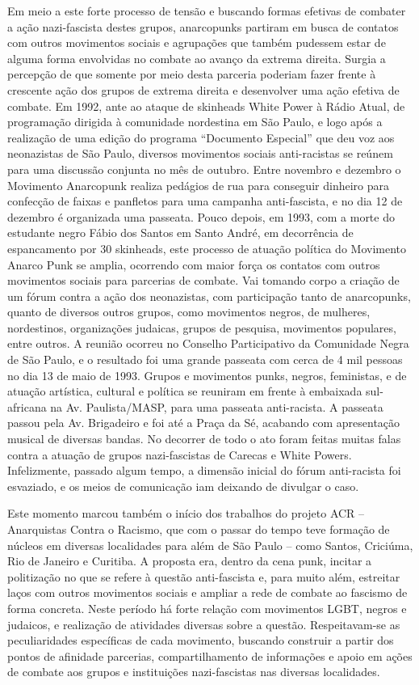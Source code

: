 Em meio a este forte processo de tensão e buscando formas efetivas de combater a ação nazi-fascista destes grupos, anarcopunks partiram em busca de contatos com outros movimentos sociais e agrupações que também pudessem estar de alguma forma envolvidas no combate ao avanço da extrema direita. Surgia a percepção de que somente por meio desta parceria poderiam fazer frente à crescente ação dos grupos de extrema direita e desenvolver uma ação efetiva de combate. Em 1992, ante ao ataque de skinheads White Power à Rádio Atual, de programação dirigida à comunidade nordestina em São Paulo, e logo após a realização de uma edição do programa “Documento Especial” que deu voz aos neonazistas de São Paulo, diversos movimentos sociais anti-racistas se reúnem para uma discussão conjunta no mês de outubro. Entre novembro e dezembro o Movimento Anarcopunk realiza pedágios de rua para conseguir dinheiro para confecção de faixas e panfletos para uma campanha anti-fascista, e no dia 12 de dezembro é organizada uma passeata. Pouco depois, em 1993, com a morte do estudante negro Fábio dos Santos em Santo André, em decorrência de espancamento por 30 skinheads, este processo de atuação política do Movimento Anarco Punk se amplia, ocorrendo com maior força os contatos com outros movimentos sociais para parcerias de combate. Vai tomando corpo a criação de um fórum contra a ação dos neonazistas, com participação tanto de anarcopunks, quanto de diversos outros grupos, como movimentos negros, de mulheres, nordestinos, organizações judaicas, grupos de pesquisa, movimentos populares, entre outros. A reunião ocorreu no Conselho Participativo da Comunidade Negra de São Paulo, e o resultado foi uma grande passeata com cerca de 4 mil pessoas no dia 13 de maio de 1993. Grupos e movimentos punks, negros, feministas, e de atuação artística, cultural e política se reuniram em frente à embaixada sul-africana na Av. Paulista/MASP, para uma passeata anti-racista. A passeata passou pela Av. Brigadeiro e foi até a Praça da Sé, acabando com apresentação musical de diversas bandas.  No decorrer de todo o ato foram feitas muitas falas contra a atuação de grupos nazi-fascistas de Carecas e White Powers. Infelizmente, passado algum tempo, a dimensão inicial do fórum anti-racista foi esvaziado, e os meios de comunicação iam deixando de divulgar o caso.

Este momento marcou também o início dos trabalhos do projeto ACR – Anarquistas Contra o Racismo, que com o passar do tempo teve formação  de núcleos em diversas localidades para além de São Paulo – como Santos, Criciúma, Rio de Janeiro e Curitiba. A proposta era, dentro da cena punk, incitar a politização no que se refere à questão anti-fascista e, para muito além, estreitar laços com outros movimentos sociais e ampliar a rede de combate ao fascismo de forma concreta. Neste período há forte relação com movimentos LGBT, negros e judaicos, e realização de atividades diversas sobre a questão. Respeitavam-se as peculiaridades específicas de cada movimento, buscando construir a partir dos pontos de afinidade parcerias, compartilhamento de informações e apoio em ações de combate aos grupos e instituições nazi-fascistas nas diversas localidades.

